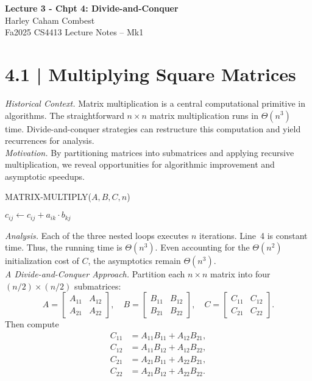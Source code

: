 \documentclass[12pt]{article}
\newcommand{\microhead}[1]{\vspace{0.45em}\noindent\textit{#1}}
\theoremstyle{definition}
\begin{document}
\begin{center}
\Large\textbf{Lecture 3 - Chpt 4: Divide-and-Conquer} \\
\large Harley Caham Combest \\
\large Fa2025 CS4413 Lecture Notes – Mk1
\end{center}

\vspace{1em}

\dotfill
\section*{4.1 | Multiplying Square Matrices}
\dotfill


\microhead{Historical Context.} Matrix multiplication is a central computational primitive in algorithms. The straightforward $n \times n$ matrix multiplication runs in $\Theta(n^3)$ time. Divide-and-conquer strategies can restructure this computation and yield recurrences for analysis.\\

\microhead{Motivation.} By partitioning matrices into submatrices and applying recursive multiplication, we reveal opportunities for algorithmic improvement and asymptotic speedups.\\

\begin{algorithm}
\caption{MATRIX-MULTIPLY($A,B,C,n$)}\label{alg:matrix-multiply}
\begin{algorithmic}[1]
      \State $c_{ij} \gets c_{ij} + a_{ik} \cdot b_{kj}$
    \EndFor
  \EndFor
\EndFor
\end{algorithmic}
\end{algorithm}

\microhead{Analysis.} Each of the three nested loops executes $n$ iterations. Line~4 is constant time. Thus, the running time is $\Theta(n^3)$. Even accounting for the $\Theta(n^2)$ initialization cost of $C$, the asymptotics remain $\Theta(n^3)$.\\

\microhead{A Divide-and-Conquer Approach.} Partition each $n \times n$ matrix into four $(n/2) \times (n/2)$ submatrices:
\[
A = \begin{bmatrix} A_{11} & A_{12} \\ A_{21} & A_{22} \end{bmatrix}, \quad
B = \begin{bmatrix} B_{11} & B_{12} \\ B_{21} & B_{22} \end{bmatrix}, \quad
C = \begin{bmatrix} C_{11} & C_{12} \\ C_{21} & C_{22} \end{bmatrix}.
\]
Then compute
\begin{align*}
C_{11} &= A_{11}B_{11} + A_{12}B_{21}, \\
C_{12} &= A_{11}B_{12} + A_{12}B_{22}, \\
C_{21} &= A_{21}B_{11} + A_{22}B_{21}, \\
C_{22} &= A_{21}B_{12} + A_{22}B_{22}.
\end{align*}
\end{document}
